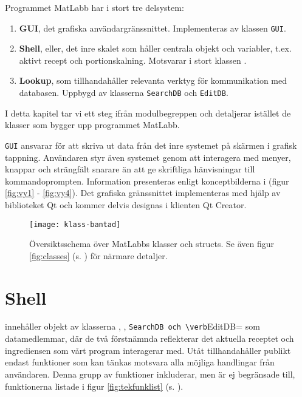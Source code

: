 Programmet MatLabb har i stort tre delsystem:

\begin{enumerate}
\item \textbf{GUI}, det grafiska användargränssnittet. Implementeras av klassen \texttt{GUI}.
\item \textbf{Shell}, eller, det inre skalet som håller centrala objekt och variabler, t.ex. aktivt recept och portionskalning. Motsvarar i stort klassen \Shell.
\item \textbf{Lookup}, som tillhandahåller relevanta verktyg för kommunikation med databasen. Uppbygd av klasserna \verb=SearchDB= och \verb=EditDB=.
\end{enumerate}

I detta kapitel tar vi ett steg ifrån modulbegreppen och detaljerar istället de klasser som bygger upp programmet MatLabb.

\texttt{GUI} ansvarar för att skriva ut data från det inre systemet på skärmen i grafisk tappning. Användaren styr även systemet genom att interagera med menyer, knappar och strängfält snarare än att ge skriftliga hänvisningar till kommandoprompten. Information presenteras enligt konceptbilderna i (figur \ref{fig:vy1} - \ref{fig:vy4}). Det grafiska gränssnittet implementeras med hjälp av biblioteket Qt och kommer delvis designas i klienten Qt Creator.

\begin{figure}[h]
  \centering
  \texttt{[image: klass-bantad]}
  \caption{Översiktsschema över MatLabbs klasser och structs. Se även figur \ref{fig:classes} (s. \pageref{fig:classes}) för närmare detaljer.}
  \label{fig:redklass}
\end{figure}

\section{Shell}
\Shell{} innehåller objekt av klasserna \Recipe{}, \InfoIngredient{}, \verb=SearchDB och \verb=EditDB= som datamedlemmar, där de två förstnämnda reflekterar det aktuella receptet och ingrediensen som vårt program interagerar med. Utåt tillhandahåller \Shell{} publikt endast funktioner som kan tänkas motsvara alla möjliga handlingar från användaren. Denna grupp av funktioner inkluderar, men är ej begränsade till, funktionerna listade i figur \ref{fig:tekfunklist} (s. \pageref{fig:tekfunklist}).

